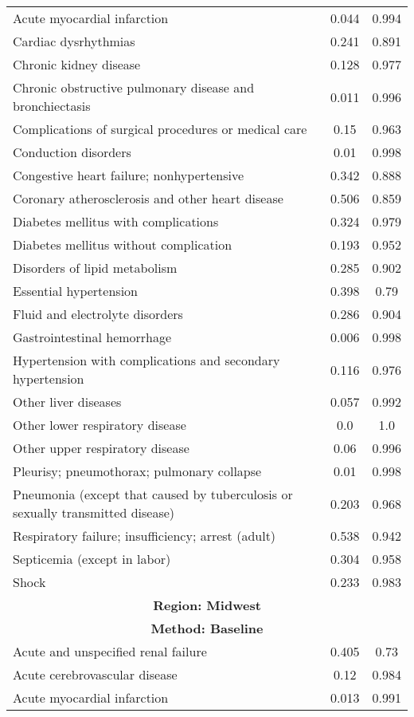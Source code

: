 \documentclass{article}
\begin{document}
\begin{longtable}{lcc}
Acute myocardial infarction & 0.044 & 0.994 \\
Cardiac dysrhythmias & 0.241 & 0.891 \\
Chronic kidney disease & 0.128 & 0.977 \\
Chronic obstructive pulmonary disease and bronchiectasis & 0.011 & 0.996 \\
Complications of surgical procedures or medical care & 0.15 & 0.963 \\
Conduction disorders & 0.01 & 0.998 \\
Congestive heart failure; nonhypertensive & 0.342 & 0.888 \\
Coronary atherosclerosis and other heart disease & 0.506 & 0.859 \\
Diabetes mellitus with complications & 0.324 & 0.979 \\
Diabetes mellitus without complication & 0.193 & 0.952 \\
Disorders of lipid metabolism & 0.285 & 0.902 \\
Essential hypertension & 0.398 & 0.79 \\
Fluid and electrolyte disorders & 0.286 & 0.904 \\
Gastrointestinal hemorrhage & 0.006 & 0.998 \\
Hypertension with complications and secondary hypertension & 0.116 & 0.976 \\
Other liver diseases & 0.057 & 0.992 \\
Other lower respiratory disease & 0.0 & 1.0 \\
Other upper respiratory disease & 0.06 & 0.996 \\
Pleurisy; pneumothorax; pulmonary collapse & 0.01 & 0.998 \\
Pneumonia (except that caused by tuberculosis or sexually transmitted disease) & 0.203 & 0.968 \\
Respiratory failure; insufficiency; arrest (adult) & 0.538 & 0.942 \\
Septicemia (except in labor) & 0.304 & 0.958 \\
Shock & 0.233 & 0.983 \\
\midrule
\midrule
\multicolumn{3}{c}{\textbf{Region: Midwest}} \\
\multicolumn{3}{c}{\textbf{Method: Baseline}} \\
\midrule
Acute and unspecified renal failure & 0.405 & 0.73 \\
Acute cerebrovascular disease & 0.12 & 0.984 \\
Acute myocardial infarction & 0.013 & 0.991 \\

\end{longtable}
\end{document}
